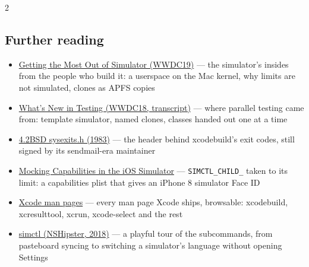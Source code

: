 \documentclass[8pt]{extarticle}
\begin{document}
\begin{multicols}{2}
\begin{htmlonly}
\section{Further reading}
\begin{itemize}
  \item \href{https://developer.apple.com/videos/play/wwdc2019/418/}{Getting the Most Out of Simulator (WWDC19)} — the simulator's insides from the people who build it: a userspace on the Mac kernel, why limits are not simulated, clones as APFS copies
  \item \href{https://asciiwwdc.com/2018/sessions/403}{What's New in Testing (WWDC18, transcript)} — where parallel testing came from: template simulator, named clones, classes handed out one at a time
  \item \href{https://www.tuhs.org/cgi-bin/utree.pl?file=4.2BSD/usr/include/sysexits.h}{4.2BSD sysexits.h (1983)} — the header behind xcodebuild's exit codes, still signed by its sendmail-era maintainer
  \item \href{https://saagarjha.com/blog/2019/01/11/mocking-capabilities-in-the-ios-simulator/}{Mocking Capabilities in the iOS Simulator} — \texttt{SIMCTL\_CHILD\_} taken to its limit: a capabilities plist that gives an iPhone 8 simulator Face ID
  \item \href{https://keith.github.io/xcode-man-pages/}{Xcode man pages} — every man page Xcode ships, browsable: xcodebuild, xcresulttool, xcrun, xcode-select and the rest
  \item \href{https://nshipster.com/simctl/}{simctl (NSHipster, 2018)} — a playful tour of the subcommands, from pasteboard syncing to switching a simulator's language without opening Settings
\end{itemize}
\end{htmlonly}

\end{multicols}

\end{document}
